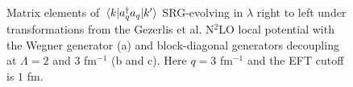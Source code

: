 \documentclass[preprintnumbers,floatfix,aps,prc,preprint,nofootinbib]{revtex4-1}
\begin{document}
\begin{figure}[H]
	\centering
	

	\caption{Matrix elements of $\mel{k}{a^{\dagger}_q a_q}{k'}$ SRG-evolving in $\lambda$ right to left under transformations from the Gezerlis et al. N$^2$LO local potential with the Wegner generator (a) and block-diagonal generators decoupling at $\Lambda=2$ and $3$ fm$^{-1}$ (b and c). Here $q=3$ fm$^{-1}$ and the EFT cutoff is $1$ fm.}
	\label{momentum_projection_contours_q3,00_kvnn222}
\end{figure}
\end{document}
